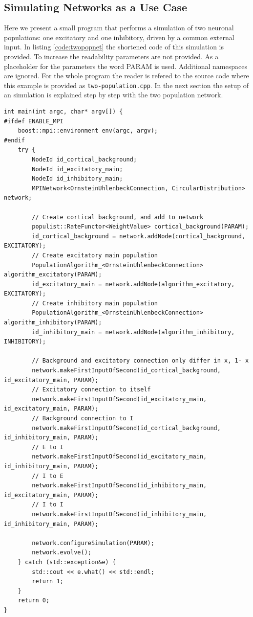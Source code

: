 \documentclass[12pt]{article}
\begin{document}
\subsection{Simulating Networks as a Use Case}
Here we present a small program that performs a simulation of two neuronal populations: one excitatory and one inhibitory, driven by a common external input.
In listing \ref{code:twopopnet} the shortened code of this simulation is provided.
To increase the readability parameters are not provided. 
As a placeholder for the parameters the word PARAM is used.
Additional namespaces are ignored. 
For the whole program the reader is refered to the source code where this example is provided as \texttt{two-population.cpp}.
In the next section the setup of an simulation is explained step by step with the two population network.
\begin{lstlisting}[caption=Simulation of a two neuronal population network.,label=code:twopopnet]
int main(int argc, char* argv[]) {
#ifdef ENABLE_MPI
	boost::mpi::environment env(argc, argv);
#endif
	try {
		NodeId id_cortical_background;
		NodeId id_excitatory_main;
		NodeId id_inhibitory_main;
		MPINetwork<OrnsteinUhlenbeckConnection, CircularDistribution> network;

		// Create cortical background, and add to network
		populist::RateFunctor<WeightValue> cortical_background(PARAM);
		id_cortical_background = network.addNode(cortical_background, EXCITATORY);
		// Create excitatory main population
		PopulationAlgorithm_<OrnsteinUhlenbeckConnection> algorithm_excitatory(PARAM);
		id_excitatory_main = network.addNode(algorithm_excitatory, EXCITATORY);
		// Create inhibitory main population
		PopulationAlgorithm_<OrnsteinUhlenbeckConnection>  algorithm_inhibitory(PARAM);
		id_inhibitory_main = network.addNode(algorithm_inhibitory, INHIBITORY);

		// Background and excitatory connection only differ in x, 1- x
		network.makeFirstInputOfSecond(id_cortical_background, id_excitatory_main, PARAM);
		// Excitatory connection to itself
		network.makeFirstInputOfSecond(id_excitatory_main, id_excitatory_main, PARAM);
		// Background connection to I
		network.makeFirstInputOfSecond(id_cortical_background, id_inhibitory_main, PARAM);
		// E to I
		network.makeFirstInputOfSecond(id_excitatory_main, id_inhibitory_main, PARAM);
		// I to E
		network.makeFirstInputOfSecond(id_inhibitory_main, id_excitatory_main, PARAM);
		// I to I
		network.makeFirstInputOfSecond(id_inhibitory_main, id_inhibitory_main, PARAM);

		network.configureSimulation(PARAM);
		network.evolve();
	} catch (std::exception&e) {
		std::cout << e.what() << std::endl;
		return 1;
	}
	return 0;
}
\end{lstlisting}
\end{document}
